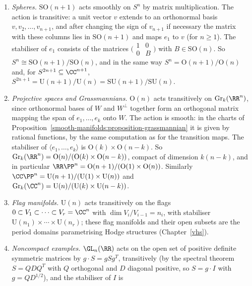 \begin{example}\label{lie-groups:example-homogeneous}
\begin{enumerate}
\item \emph{Spheres.} $\mathrm{SO}(n + 1)$ acts smoothly on $S^n$ by matrix multiplication. The action is transitive: a unit vector $v$ extends to an
orthonormal basis $v, v_2, \ldots, v_{n+1}$, and after changing the sign of $v_{n+1}$ if necessary the matrix with these columns lies in $\mathrm{SO}(n + 1)$ and
maps $e_1$ to $v$ (for $n \geq 1$). The stabiliser of $e_1$ consists of the matrices $\bigl(\begin{smallmatrix}1 & 0\\ 0 & B\end{smallmatrix}\bigr)$ with
$B \in \mathrm{SO}(n)$. So $S^n \cong \mathrm{SO}(n + 1)/\mathrm{SO}(n)$, and in the same way $S^n = \mathrm{O}(n + 1)/\mathrm{O}(n)$ and, for
$S^{2n+1} \subseteq \CC^{n+1}$, $S^{2n+1} = \mathrm{U}(n + 1)/\mathrm{U}(n) = \mathrm{SU}(n + 1)/\mathrm{SU}(n)$.
\item \emph{Projective spaces and Grassmannians.} $\mathrm{O}(n)$ acts transitively on $\mathrm{Gr}_k(\RR^n)$, since orthonormal bases of $W$ and $W^\perp$
together form an orthogonal matrix mapping the span of $e_1, \ldots, e_k$ onto $W$. The action is smooth: in the charts of
Proposition~\ref{smooth-manifolds:proposition-grassmannian} it is given by rational functions, by the same computation as for the transition maps. The
stabiliser of $\langle e_1, \ldots, e_k\rangle$ is $\mathrm{O}(k) \times \mathrm{O}(n - k)$. So
$\mathrm{Gr}_k(\RR^n) = \mathrm{O}(n)/(\mathrm{O}(k) \times \mathrm{O}(n - k))$, compact of dimension $k(n - k)$, and in particular
$\RR\PP^n = \mathrm{O}(n + 1)/(\mathrm{O}(1) \times \mathrm{O}(n))$. Similarly
$\CC\PP^n = \mathrm{U}(n + 1)/(\mathrm{U}(1) \times \mathrm{U}(n))$ and $\mathrm{Gr}_k(\CC^n) = \mathrm{U}(n)/(\mathrm{U}(k) \times \mathrm{U}(n - k))$.
\item \emph{Flag manifolds.} $\mathrm{U}(n)$ acts transitively on the flags $0 \subset V_1 \subset \cdots \subset V_r = \CC^n$ with $\dim V_i/V_{i-1} = n_i$,
with stabiliser $\mathrm{U}(n_1) \times \cdots \times \mathrm{U}(n_r)$; these flag manifolds and their open subsets are the period domains parametrising Hodge
structures (Chapter~\ref{vhs}).
\item \emph{Noncompact examples.} $\GL_n(\RR)$ acts on the open set of positive definite symmetric matrices by $g \cdot S = gSg^T$, transitively (by the
spectral theorem $S = QDQ^T$ with $Q$ orthogonal and $D$ diagonal positive, so $S = g \cdot I$ with $g = QD^{1/2}$), and the stabiliser of $I$ is

\end{enumerate}
\end{example}
